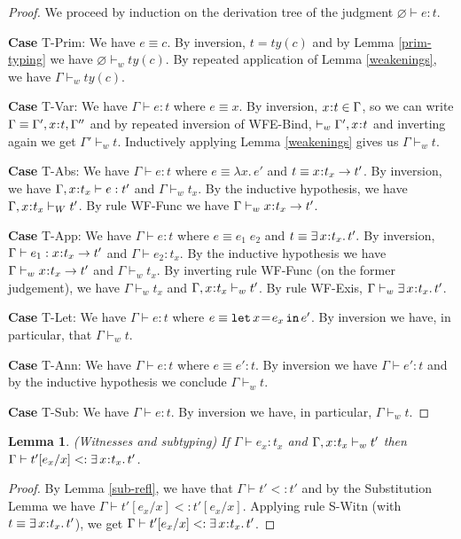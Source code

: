 \documentclass[11pt]{article}
\newtheorem{lemma}[theorem]{Lemma}
\newcommand{\bind}{\hspace{0.05em}{:}\hspace{0.05em}} %
\newcommand{\col}{\mathbin{:}}       %
\newcommand{\existype}[3]{\exists\, #1\bind #2.\, #3}
\newcommand{\functype}[3]{#1\bind #2 \rightarrow #3}
\newcommand{\letin}[3]{{\tt let}\,#1\hspace{0.1em}{=}\hspace{0.1em}#2\,{\tt in}\,#3}
\begin{document}
\begin{proof} 
We proceed by induction on the derivation tree of the judgment $\varnothing \vdash e : t$.

{\bf Case} {\sc T-Prim}: We have $e \equiv c$. By inversion, $t = ty(c)$ and by Lemma \ref{prim-typing} we have $\varnothing \vdash_ w ty(c)$. By repeated application of Lemma \ref{weakenings}, we have $\Gamma \vdash_w ty(c)$. 

{\bf Case} {\sc T-Var}: We have $\Gamma \vdash e : t$ where $e \equiv x$. By inversion, $x\bind t \in \Gamma$, so we can write $\Gamma \equiv \Gamma', x\bind t,\Gamma''$ and by repeated inversion of {\sc WFE-Bind}, $\vdash_w \Gamma',x\bind t$ and inverting again we get $\Gamma' \vdash_w t$. Inductively applying Lemma \ref{weakenings} gives us $\Gamma \vdash_w t$.

{\bf Case} {\sc T-Abs}: We have $\Gamma \vdash e : t$ where $e \equiv \lambda x.\, e'$ and $t \equiv \functype{x}{t_x}{t'}$. By inversion, we have $\Gamma, x\bind t_x \vdash e : t'$ and $\Gamma \vdash_w t_x$. By the inductive hypothesis, we have $\Gamma, x\bind t_x \vdash_W t'$. By rule {\sc WF-Func} we have $\Gamma \vdash_w \functype{x}{t_x}{t'}$.

{\bf Case} {\sc T-App}: We have $\Gamma \vdash e : t$ where $e \equiv e_1\; e_2$ and $t \equiv \existype{x}{t_x}{t'}.$ By inversion, $\Gamma \vdash e_1 : \functype{x}{t_x}{t'}$ and $\Gamma \vdash e_2 : t_x$. By the inductive hypothesis we have $\Gamma \vdash_w \functype{x}{t_x}{t'}$ and $\Gamma \vdash_w t_x$. By inverting rule {\sc WF-Func} (on the former judgement), we have $\Gamma \vdash_w t_x$ and $\Gamma,x\bind t_x \vdash_w t'$. By rule {\sc WF-Exis}, $\Gamma \vdash_w \existype{x}{t_x}{t'}$.

{\bf Case} {\sc T-Let}: We have $\Gamma \vdash e : t$ where $e \equiv \letin{x}{e_x}{e'}$. By inversion we have, in particular, that $\Gamma \vdash_w t$.

{\bf Case} {\sc T-Ann}: We have $\Gamma \vdash e : t$ where $e \equiv e'\col t$. By inversion we have $\Gamma \vdash e' : t$ and by the inductive hypothesis we conclude $\Gamma \vdash_w t$.

{\bf Case} {\sc T-Sub}: We have $\Gamma \vdash e : t$. By inversion we have, in particular, $\Gamma \vdash_w t$.
\end{proof}


\begin{lemma}\label{witness-sub}
(Witnesses and subtyping) If $\Gamma \vdash e_x : t_x$ and $\Gamma, x\bind t_x \vdash_w t'$ then $\Gamma \vdash t'[e_x/x] <: \existype{x}{t_x}{t'}$.
\end{lemma}
\begin{proof}
By Lemma \ref{sub-refl}, we have that $\Gamma \vdash t' <: t'$ and by the Substitution Lemma we have $\Gamma \vdash t'[e_x/x] <: t'[e_x/x]$.  Applying rule {\sc S-Witn} (with $t\equiv \existype{x}{t_x}{t'}$), we get $\Gamma \vdash t'[e_x/x] <: \existype{x}{t_x}{t'}$.
\end{proof}
\end{document}
